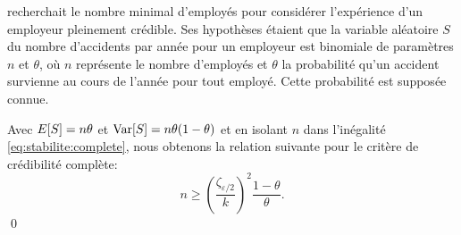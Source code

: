 \begin{exemple}
  \label{exemple:stabilite:binomiale_pure}
  \cite{Mowbray:1914} recherchait le nombre minimal d'employés pour
  considérer l'expérience d'un employeur pleinement crédible. Ses
  hypothèses étaient que la variable aléatoire $S$ du nombre
  d'accidents par année pour un employeur est binomiale de paramètres
  $n$ et $\theta$, où $n$ représente le nombre d'employés et $\theta$
  la probabilité qu'un accident survienne au cours de l'année pour
  tout employé. Cette probabilité est supposée connue.

  Avec $E [ S ] = n \theta$ et $\operatorname{Var} [ S ] = n \theta (1 - \theta)$ et en
  isolant $n$ dans l'inégalité \eqref{eq:stabilite:complete}, nous
  obtenons la relation suivante pour le critère de crédibilité
  complète:
  \begin{displaymath}
    n \geq
    \left(
      \frac{\zeta_{\varepsilon/2}}{k}
    \right)^2
    \frac{1 - \theta}{\theta}.
  \end{displaymath}
  \qed
\end{exemple}


